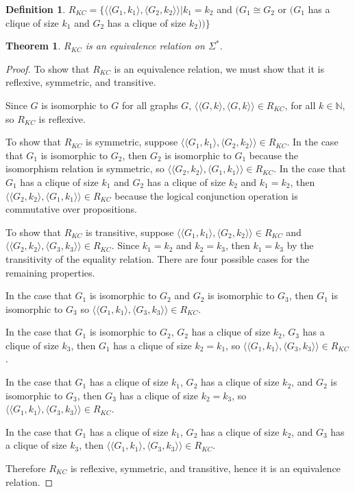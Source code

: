 \documentclass{article}
\newtheorem{theorem}{Theorem}[section]
\theoremstyle{definition} \newtheorem{definition}[definition]{Definition}
\newcommand{\sigmastar}{\Sigma^{*}} %
\newcommand{\pair}[2]{\langle#1,#2\rangle} %
\begin{document}
\begin{definition}
  $R_{KC}=\{\pair{\pair{G_1}{k_1}}{\pair{G_2}{k_2}}| k_1=k_2$ and $(G_1\cong
  G_2$ or $(G_1$ has a clique of size $k_1$ and $G_2$ has a clique of size
  $k_2))\}$
\end{definition}

\begin{theorem}
  $R_{KC}$ is an equivalence relation on $\sigmastar$.
\end{theorem}
\begin{proof}To show that $R_{KC}$ is an equivalence relation, we must show
  that it is reflexive, symmetric, and transitive.

  Since $G$ is isomorphic to $G$ for all graphs $G$,
  $\pair{\pair{G}{k}}{\pair{G}{k}}\in R_{KC}$, for all $k\in\mathbb{N}$, so
  $R_{KC}$ is reflexive.

  To show that $R_{KC}$ is symmetric, suppose
  $\pair{\pair{G_1}{k_1}}{\pair{G_2}{k_2}}\in R_{KC}$. In the case that $G_1$
  is isomorphic to $G_2$, then $G_2$ is isomorphic to $G_1$ because the
  isomorphism relation is symmetric, so
  $\pair{\pair{G_2}{k_2}}{\pair{G_1}{k_1}}\in R_{KC}$. In the case that $G_1$
  has a clique of size $k_1$ and $G_2$ has a clique of size $k_2$ and
  $k_1=k_2$, then $\pair{\pair{G_2}{k_2}}{\pair{G_1}{k_1}}\in R_{KC}$ because
  the logical conjunction operation is commutative over propositions.

  To show that $R_{KC}$ is transitive, suppose
  $\pair{\pair{G_1}{k_1}}{\pair{G_2}{k_2}}\in R_{KC}$ and
  $\pair{\pair{G_2}{k_2}}{\pair{G_3}{k_3}}\in R_{KC}$. Since $k_1=k_2$ and
  $k_2=k_3$, then $k_1=k_3$ by the transitivity of the equality relation. There
  are four possible cases for the remaining properties.

  In the case that $G_1$ is isomorphic to $G_2$ and $G_2$ is isomorphic to
  $G_3$, then $G_1$ is isomorphic to $G_3$ so
  $\pair{\pair{G_1}{k_1}}{\pair{G_3}{k_3}}\in R_{KC}$.

  In the case that $G_1$ is isomorphic to $G_2$, $G_2$ has a clique of size
  $k_2$, $G_3$ has a clique of size $k_3$, then $G_1$ has a clique of size
  $k_2=k_1$, so $\pair{\pair{G_1}{k_1}}{\pair{G_3}{k_3}}\in R_{KC}$.

  In the case that $G_1$ has a clique of size $k_1$, $G_2$ has a clique of size
  $k_2$, and $G_2$ is isomorphic to $G_3$, then $G_3$ has a clique
  of size $k_2=k_3$, so $\pair{\pair{G_1}{k_1}}{\pair{G_3}{k_3}}\in R_{KC}$.

  In the case that $G_1$ has a clique of size $k_1$, $G_2$ has a clique of size
  $k_2$, and $G_3$ has a clique of size $k_3$, then
  $\pair{\pair{G_1}{k_1}}{\pair{G_3}{k_3}}\in R_{KC}$.

  Therefore $R_{KC}$ is reflexive, symmetric, and transitive, hence it is an
  equivalence relation.
\end{proof}
\end{document}
